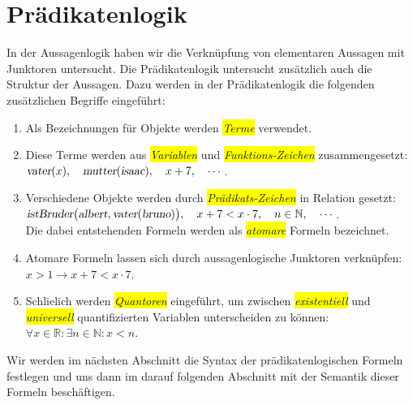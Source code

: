 \chapter{Pr\"{a}dikatenlogik}
In der Aussagenlogik haben wir die Verkn\"{u}pfung von elementaren Aussagen mit Junktoren untersucht.
Die Pr\"{a}dikatenlogik untersucht zus\"{a}tzlich auch die Struktur der Aussagen.  Dazu werden in der Pr\"{a}dikatenlogik 
die folgenden zus\"{a}tzlichen Begriffe eingef\"{u}hrt:
\begin{enumerate}
\item Als Bezeichnungen f\"{u}r Objekte werden \colorbox{yellow}{\emph{Terme}} verwendet.
\item Diese Terme werden aus \colorbox{yellow}{\emph{Variablen}} und \colorbox{yellow}{\emph{Funktions-Zeichen}}
      zusammengesetzt: 
      \\[0.2cm]
      \hspace*{1.3cm}
      $\textsl{vater}(x),\quad \textsl{mutter}(\textsl{isaac}), \quad x+7, \quad \cdots$.
\item Verschiedene Objekte werden durch \colorbox{yellow}{\emph{Pr\"{a}dikats-Zeichen}} in Relation gesetzt:
      \\[0.2cm]
      \hspace*{1.3cm}
      $\textsl{istBruder}\bigl(\textsl{albert}, \textsl{vater}(\textsl{bruno})\bigr),\quad x+7 < x\cdot 7,\quad n \in \mathbb{N}, \quad \cdots$.
      \\[0.2cm]
      Die dabei entstehenden Formeln werden als \colorbox{yellow}{\emph{atomare}} Formeln bezeichnet.
\item Atomare Formeln lassen sich durch aussagenlogische Junktoren verkn\"{u}pfen:
      \\[0.2cm]
      \hspace*{1.3cm}
      $x > 1 \rightarrow x + 7 < x \cdot  7$.
\item Schlie\3lich werden \colorbox{yellow}{\emph{Quantoren}} eingef\"{u}hrt, um zwischen \colorbox{yellow}{\emph{existentiell}} und
      \colorbox{yellow}{\emph{universell}} quantifizierten Variablen unterscheiden
      zu k\"{o}nnen:
      \\[0.2cm]
      \hspace*{1.3cm}
      $\forall x \in \mathbb{R}: \exists n \in \mathbb{N}: x < n$.
\end{enumerate}
Wir werden im n\"{a}chsten Abschnitt die Syntax der pr\"{a}dikatenlogischen Formeln festlegen und uns dann
im darauf folgenden Abschnitt mit der Semantik dieser Formeln besch\"{a}ftigen.

